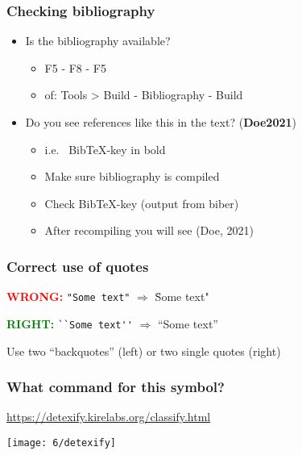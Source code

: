 \documentclass[aspectratio=169]{beamer}
\begin{document}
\begin{frame}
  \frametitle{Checking bibliography}

  \begin{itemize}
        \item Is the bibliography available?
       \begin{itemize}
           \item F5 - F8 - F5
           \item of: Tools > Build - Bibliography - Build
       \end{itemize}
        \item Do you see references like this in the text? (\textbf{Doe2021})
       \begin{itemize}
           \item i.e. ~Bib{\TeX}-key in bold
           \item Make sure bibliography is compiled
           \item Check Bib{\TeX}-key (output from biber)
           \item After recompiling you will see (Doe, 2021)
       \end{itemize}
  \end{itemize}

\end{frame}

\begin{frame}[fragile]
  \frametitle{Correct use of quotes}

  \textcolor{red}{\textbf{WRONG:}} \verb|"Some text"| $\Rightarrow$ \"Some text"

  \bigskip

  \textcolor{green}{\textbf{RIGHT:}} \verb|``Some text''| $\Rightarrow$ ``Some text''

  \bigskip

  Use two ``backquotes'' (left) or two single quotes (right)
\end{frame}

\begin{frame}
  \frametitle{What command for this symbol?}

  \url{https://detexify.kirelabs.org/classify.html}

  \centering
  \texttt{[image: 6/detexify]}

\end{frame}
\end{document}
